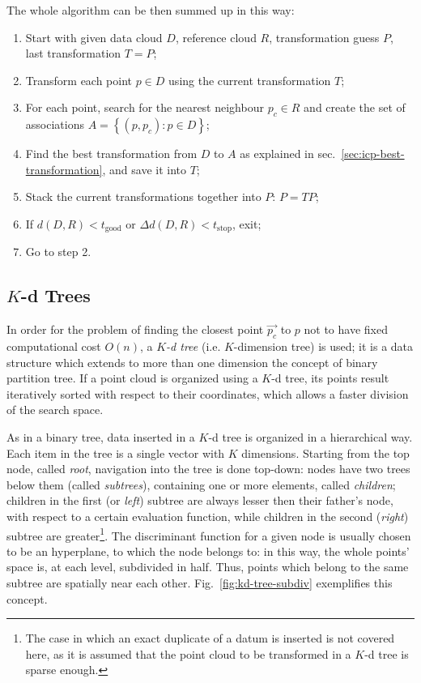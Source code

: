 The whole algorithm can be then summed up in this way:
\begin{enumerate}
\item{Start with given data cloud $D$, reference cloud $R$, transformation
  guess $P$, last transformation $T=P$;}
\item{Transform each point $p \in D$ using the current transformation $T$;}
\item{For each point, search for the nearest neighbour $p_c \in R$ and create
  the set of associations $A=\left\{(p,p_c) : p \in D \right\}$;}
\item{Find the best transformation from $D$ to $A$ as explained in sec.~\ref{sec:icp-best-transformation}, and save it into $T$;}
\item{Stack the current transformations together into $P$: $P=TP$;}
\item{If $d(D,R)<t_{\text{good}}$ or $\Delta d(D,R)<t_{\text{stop}}$, exit;}
\item{Go to step 2.}
\end{enumerate}
\subsection{$K$-d Trees} \label{kdtree}
In order for the problem of finding the closest point $\vec{p_c}$ to $p$ not to
have fixed computational cost $O(n)$, a \emph{$K$-d tree} (i.e.
$K$-dimension tree) is used; it is
a data structure which extends to more than one dimension the concept of binary
partition tree. If a point cloud is organized using a $K$-d tree, its points
result iteratively sorted with respect to their coordinates, which allows a
faster division of the search space.

As in a binary tree, data inserted in a $K$-d tree is organized in a
hierarchical way. Each item in the tree is a single vector with $K$ dimensions.
Starting from the top node, called \emph{root}, navigation into the tree is done
top-down: nodes have two trees below them (called \emph{subtrees}), containing one
or more elements, called \emph{children}; children in the first (or \emph{left})
subtree are always lesser then their father's node, with respect to a certain
evaluation function, while children in the second (\emph{right}) subtree are
greater\footnote{The case in which an exact duplicate of a datum is inserted is
 not covered here, as it is assumed that the point cloud to be transformed in a
 $K$-d tree is sparse enough.}. The discriminant function for a given node is usually chosen to be an hyperplane, to
which the node belongs to: in
this way, the whole points' space is, at each level, subdivided in half. Thus,
points which belong to the same subtree are spatially near each other.
Fig.~\ref{fig:kd-tree-subdiv} exemplifies this concept.

